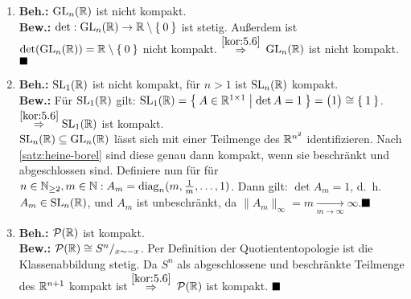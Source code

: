 \begin{solution}[\ref{ub3:aufg1}]
    \begin{enumerate}[label=(\alph*)]
        \item \textbf{Beh.:} $\mathrm{GL}_n(\mathbb{R})$ ist nicht kompakt.\\
            \textbf{Bew.:} $\det: \mathrm{GL}_n(\mathbb{R}) \rightarrow \mathbb{R} \setminus \Set{0}$
                ist stetig. Außerdem ist 
                $\det(\mathrm{GL}_n(\mathbb{R})) = \mathbb{R} \setminus \Set{0}$ nicht 
                kompakt. $\stackrel{\ref{kor:5.6}}{\Rightarrow}$ 
                $\mathrm{GL}_n(\mathbb{R})$ ist nicht kompakt. $\qed$
        \item \textbf{Beh.:} $\mathrm{SL}_1(\mathbb{R})$ ist nicht kompakt, für $n > 1$ ist $\mathrm{SL}_n(\mathbb{R})$ kompakt.\\
            \textbf{Bew.:} Für $\mathrm{SL}_1(\mathbb{R})$ gilt:
                $\mathrm{SL}_1(\mathbb{R}) = \Set{A \in \ensuremath{\mathbb{R}}^{1 \times 1} | \det A = 1} = \begin{pmatrix}1\end{pmatrix} \cong \Set{1}$.
                $\stackrel{\ref{kor:5.6}}{\Rightarrow} \mathrm{SL}_1(\mathbb{R})$ ist
                kompakt.\\

                $\mathrm{SL}_n(\mathbb{R}) \subseteq \mathrm{GL}_n(\mathbb{R})$ lässt sich mit einer
                Teilmenge des $\mathbb{R}^{n^2}$ identifizieren. Nach \cref{satz:heine-borel}
                sind diese genau dann kompakt, wenn sie beschränkt und 
                abgeschlossen sind. Definiere nun für für $n \in \mathbb{N}_{\geq 2}, m \in \mathbb{N}: A_m = \text{diag}_n(m, \frac{1}{m}, \dots, 1)$.
                Dann gilt: $\det A_m = 1$, d.~h. $A_m \in \mathrm{SL}_n(\mathbb{R})$,
                und $A_m$ ist unbeschränkt, da $\|A_m\|_\infty =m \xrightarrow[m \rightarrow \infty]{} \infty$.$\qed$
        \item \textbf{Beh.:} $\mathcal{P}(\mathbb{R})$ ist kompakt.\\
            \textbf{Bew.:} $\mathcal{P}(\mathbb{R}) \cong S^n/_{x \sim -x}$.
                Per Definition der Quotiententopologie ist die Klassenabbildung stetig.
                Da $S^n$ als abgeschlossene und beschränkte Teilmenge
                des $\mathbb{R}^{n+1}$ kompakt ist $\stackrel{\ref{kor:5.6}}{\Rightarrow}$
                $\mathcal{P}(\mathbb{R})$ ist kompakt. $\qed$
    \end{enumerate}
\end{solution}

